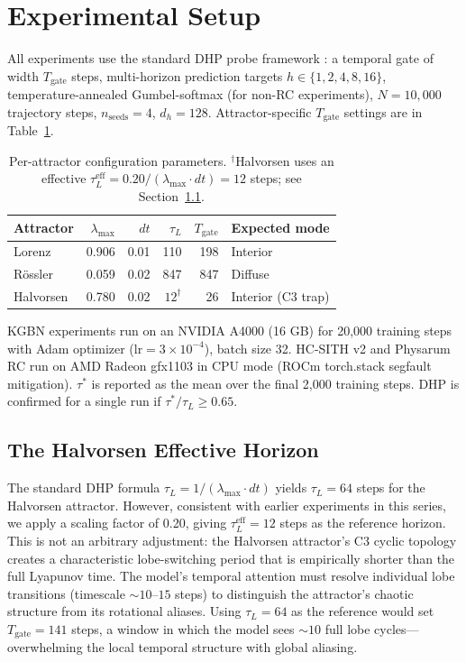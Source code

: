 \documentclass[12pt]{article}
\theoremstyle{definition}
\begin{document}
\section{Experimental Setup}

All experiments use the standard DHP probe framework \citep{archon2026d}: a
temporal gate of width $T_{\text{gate}}$ steps, multi-horizon prediction targets
$h \in \{1,2,4,8,16\}$, temperature-annealed Gumbel-softmax (for non-RC experiments),
$N=10{,}000$ trajectory steps, $n_{\text{seeds}}=4$, $d_h=128$. Attractor-specific
$T_{\text{gate}}$ settings are in Table~\ref{tab:configs}.

\begin{table}[h]
\centering
\caption{Per-attractor configuration parameters. $^\dagger$Halvorsen uses an effective $\tau_L^{\text{eff}} = 0.20/( \lambda_{\max} \cdot dt) = 12$ steps; see Section~\ref{sec:halv_taul}.}
\label{tab:configs}
\begin{tabular}{lrrrrl}
\toprule
Attractor & $\lambda_{\max}$ & $dt$ & $\tau_L$ & $T_{\text{gate}}$ & Expected mode \\
\midrule
Lorenz    & 0.906 & 0.01 & 110 & 198 & Interior \\
R\"{o}ssler   & 0.059 & 0.02 & 847 & 847 & Diffuse   \\
Halvorsen & 0.780 & 0.02 & $12^\dagger$ & 26 & Interior (C3 trap) \\
\bottomrule
\end{tabular}
\end{table}

KGBN experiments run on an NVIDIA A4000 (16 GB) for 20{,}000 training steps with
Adam optimizer ($\text{lr}=3\times10^{-4}$), batch size 32. HC-SITH v2 and Physarum
RC run on AMD Radeon gfx1103 in CPU mode (ROCm torch.stack segfault mitigation).
$\tau^*$ is reported as the mean over the final 2{,}000 training steps.
DHP is confirmed for a single run if $\tau^*/\tau_L \geq 0.65$.


\subsection{The Halvorsen Effective Horizon}
\label{sec:halv_taul}

The standard DHP formula $\tau_L = 1/(\lambda_{\max} \cdot dt)$ yields $\tau_L = 64$ steps for the
Halvorsen attractor. However, consistent with earlier experiments in this series, we apply a scaling
factor of 0.20, giving $\tau_L^{\text{eff}} = 12$ steps as the reference horizon. This is not an
arbitrary adjustment: the Halvorsen attractor's C3 cyclic topology creates a characteristic
lobe-switching period that is empirically shorter than the full Lyapunov time. The model's temporal
attention must resolve individual lobe transitions (timescale $\sim 10$--$15$ steps) to distinguish
the attractor's chaotic structure from its rotational aliases. Using $\tau_L = 64$ as the reference
would set $T_{\text{gate}} = 141$ steps, a window in which the model sees $\sim 10$ full lobe cycles---
overwhelming the local temporal structure with global aliasing.
\end{document}
